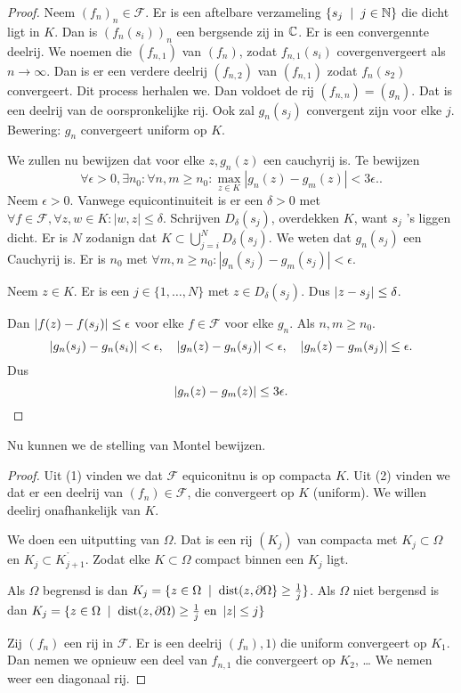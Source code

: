 \begin{proof}
	Neem $(f_n)_n \in \mathcal{F} $. Er is een aftelbare verzameling $\{s_j \st j \in \N\} $ die  dicht ligt in $K$.	
	Dan is $(f_n(s_i))_n$ een bergsende zij in $\mathbb{C}$. 
	Er is een convergennte deelrij. We noemen die $(f_{n,1})$ van $(f_n)$, zodat $f_{n, 1}(s_i)$ covergenvergeert als $n \to \infty$.  
	Dan is er een verdere deelrij $(f_{n, 2})$ van $(f_{n, 1})$ zodat  $f_n(s_2)$ convergeert.  Dit process herhalen we.
	Dan voldoet de rij $(f_{n, n}) =  (g_n)$. Dat is een deelrij van de oorspronkelijke rij. 
	Ook zal  $g_n(s_j)$ convergent zijn voor elke $j$. 
	Bewering: $g_n$ convergeert uniform op $K$.

	We zullen nu bewijzen dat voor elke  $z, g_n(z) $ een cauchyrij is. 
	Te bewijzen \[
		\forall \epsilon > 0, \exists  n_0: \forall n, m \ge n_0: \max_{z \in K}|g_n(z) - g_m(z)| <3 \epsilon. 
	.\] 
	Neem $\epsilon > 0$. Vanwege equicontinuiteit is er een $\delta > 0$ met $\forall f \in \mathcal{F} , \forall z, w \in K: |w, z |\le \delta$. 
	Schrijven $D_\delta(s_j)$, overdekken $K$, want $s_j$ 's liggen dicht. 
	Er is $N$ zodanign dat $K \subset \bigcup_{j = i} ^{N}D_\delta(s_j)$. 
	We weten dat $g_n(s_j)$ een Cauchyrij is. 
	Er is $n_0$ met $\forall m,n \ge n_0: |g_n (s_j) - g_m(s_j)| < \epsilon$. 
	
	Neem  $z \in K$. Er is een $j \in \{1, \ldots, N\}$ met $z \in D_{\delta}(s_j)$. 
Dus $\left| z - s_j \right| \le \delta$. 

Dan $\left| f(z) - f(s_j) \right| \le \epsilon$ voor elke $f \in \mathcal{F} $ voor elke $g_n$.
Als $n, m \ge n_0$.
\[
	\left| g_n(s_j) - g_n(s_i) \right| < \epsilon, \quad \left| g_n(z)- g_n(s_j) \right| < \epsilon, \quad \left| g_n(z) - g_m(s_j)  \right| \le \epsilon. 
\] 
Dus 
 \[
	 \left| g_n(z) - g_m(z) \right| \le 3 \epsilon
.\]
\end{proof}
Nu kunnen we de stelling van Montel bewijzen. 
\begin{proof}
	Uit (1) vinden we dat $\mathcal{F} $ equiconitnu is op compacta $K$. 
	Uit (2) vinden we dat er een deelrij van $(f_n) \in \mathcal{F}  $, die convergeert op  $K$ (uniform). 
	We willen deelirj onafhankelijk van $K$. 

	We doen een uitputting van $\Omega$. Dat is een rij $(K_j)$ van compacta met  $K_j \subset \Omega$ en $K_j \subset  \mathring{K_{j + 1}}$. 
	Zodat elke $K \subset \Omega$ compact binnen een $K_j$ ligt. 

Als $\Omega$ begrensd is dan  $K_j = \{z \in \Omega \st \text{dist}(z , \partial \Omega\}  \ge \frac{1}{j}\}$.
	Als $\Omega$ niet bergensd is dan $K_j = \{z \in \Omega \st \text{dist}(z, \partial \Omega) \ge \frac{1}{j} \text{ en } \abs{z} \le j\} $

	Zij $(f_n)$ een rij in $\mathcal{F} $. Er is een deelrij $(f_n), 1)$ die uniform convergeert op $K_1$. Dan nemen we opnieuw een deel van $f_{n, 1}$ die convergeert op $K_2$, \ldots
	We nemen weer een diagonaal rij. 
\end{proof}
